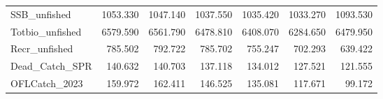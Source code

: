 \documentclass[
  english,
  a4paper,
]{article}
\begin{document}
\begin{landscape}
\begin{table}
\begin{tabular}[t]{lrrrrrr}
SSB\_unfished & 1053.330 & 1047.140 & 1037.550 & 1035.420 & 1033.270 & 1093.530\\
Totbio\_unfished & 6579.590 & 6561.790 & 6478.810 & 6408.070 & 6284.650 & 6479.950\\
Recr\_unfished & 785.502 & 792.722 & 785.702 & 755.247 & 702.293 & 639.422\\
Dead\_Catch\_SPR & 140.632 & 140.703 & 137.118 & 134.012 & 127.521 & 121.555\\
OFLCatch\_2023 & 159.972 & 162.411 & 146.525 & 135.081 & 117.671 & 99.172\\
\bottomrule
\end{tabular}
\end{table}
\end{landscape}

\begin{table}


\end{table}
\end{document}
